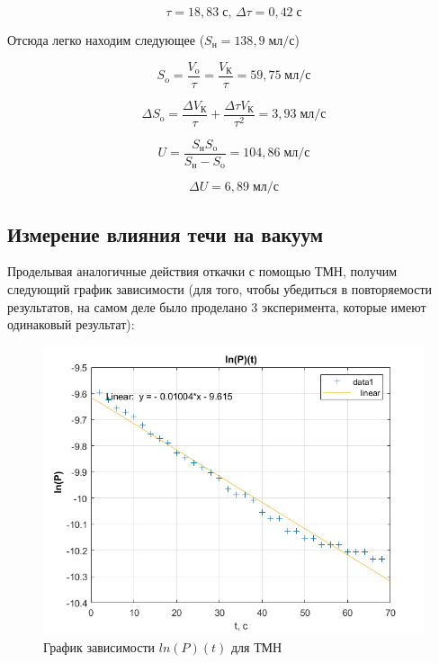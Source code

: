 \documentclass[a4paper, 12pt]{article} %
\begin{document}
\begin{equation}
    \tau = 18,83 \; \text{с, } \Delta \tau = 0,42 \; \text{с}
\end{equation}

Отсюда легко находим следующее ($S_{\text{н}} = 138,9 \; \text{мл/с}$)

\begin{equation}
    S_{\text{o}} = \frac{V_{\text{o}}}{\tau} = \frac{V_{\text{К}}}{\tau} = 59,75 \; \text{мл/с}
\end{equation}

\begin{equation}
    \Delta S_{\text{o}} = \frac{\Delta V_{\text{К}}}{\tau} + \frac{\Delta \tau V_{\text{К}}}{\tau^2} = 3,93 \; \text{мл/с}
\end{equation}

\begin{equation}
    U = \frac{S_{\text{н}} S_{\text{o}}}{S_{\text{н}} - S_{\text{o}}} = 104,86 \; \text{мл/с}
\end{equation}

\begin{equation}
    \Delta U = 6,89\; \text{мл/с}
\end{equation}


\subsection{Измерение влияния течи на вакуум}

Проделывая аналогичные действия откачки с помощью ТМН, получим следующий график зависимости (для того, чтобы убедиться в повторяемости результатов, на самом деле было проделано 3 эксперимента, которые имеют одинаковый результат):

\begin{figure}[h]
    \centering
    \includegraphics[width = 11 cm]{fig2}
    \caption{График зависимости $ln(P)(t)$ для ТМН}
    \label{fig:vac}
\end{figure}
\end{document}

